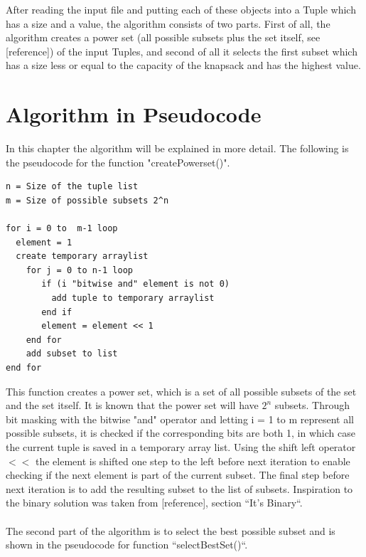 \documentclass{inc/mas}
\begin{document}
After reading the input file and putting each of these objects into a Tuple which has a size and a value, the algorithm consists of two parts. First of all, the algorithm creates a power set (all possible subsets plus the set itself, see [reference]) of the input Tuples, and second of all it selects the first subset which has a size less or equal to the capacity of the knapsack and has the highest value.\\
 

\section{Algorithm in Pseudocode}
In this chapter the algorithm will be explained in more detail. The following is the pseudocode for the function "createPowerset()". \newline

\begin{lstlisting}
n = Size of the tuple list 	
m = Size of possible subsets 2^n

for i = 0 to  m-1 loop
  element = 1  
  create temporary arraylist  
    for j = 0 to n-1 loop
       if (i "bitwise and" element is not 0)
         add tuple to temporary arraylist
       end if
       element = element << 1
    end for
    add subset to list
end for
\end{lstlisting}

\noindent This function creates a power set, which is a set of all possible subsets of the set and the set itself. It is known that the power set will have $2^n$ subsets. Through bit masking with the bitwise "and" operator and letting i = 1 to m represent all possible subsets, it is checked if the corresponding bits are both 1, in which case the current tuple is saved in a temporary array list. Using the shift left operator $<<$ the element is shifted one step to the left before next iteration to enable checking if the next element is part of the current subset. The final step before next iteration is to add the resulting subset to the list of subsets. Inspiration to the binary solution was taken from [reference], section ``It's Binary``. \\ \\ 

The second part of the algorithm is to select the best possible subset and is shown in the pseudocode for function ``selectBestSet()``.\\
\end{document}
